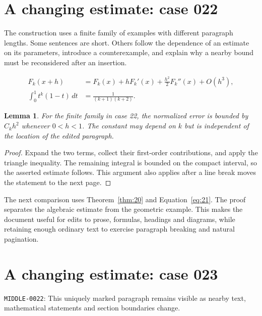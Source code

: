 \documentclass[a4paper,10pt]{article}
\newtheorem{lemma}[theorem]{Lemma}
\begin{document}
\lipsum[3]

\section{A changing estimate: case 022}\label{unit:21}
The construction uses a finite family of examples with different paragraph lengths. Some sentences are short. Others follow the dependence of an estimate on its parameters, introduce a counterexample, and explain why a nearby bound must be reconsidered after an insertion.

\lipsum[4-5]
\begin{align}\label{eq:21}
 F_k(x+h)&=F_k(x)+hF_k'(x)+\frac{h^2}{2}F_k''(x)+O(h^3),\\
 \int_0^1 t^k(1-t)\,dt&=\frac{1}{(k+1)(k+2)}.
\end{align}
\begin{lemma}\label{thm:21}
For the finite family in case 22, the normalized error is bounded by $C_k h^2$ whenever $0<h<1$. The constant may depend on $k$ but is independent of the location of the edited paragraph.
\end{lemma}
\begin{proof}
Expand the two terms, collect their first-order contributions, and apply the
triangle inequality. The remaining integral is bounded on the compact interval,
so the asserted estimate follows. This argument also applies after a line break
moves the statement to the next page.
\end{proof}
\begin{center}
\end{center}
The next comparison uses Theorem~\ref{thm:20} and Equation~\ref{eq:21}. The proof separates the algebraic estimate from the geometric example. This makes the document useful for edits to prose, formulas, headings and diagrams, while retaining enough ordinary text to exercise paragraph breaking and natural pagination.

\lipsum[8]

\section{A changing estimate: case 023}\label{unit:22}
\hypertarget{varied:middle}{}\label{anchor:middle}
\noindent \texttt{MIDDLE-0022}: This uniquely marked paragraph remains visible as nearby text, mathematical statements and section boundaries change.
\end{document}
